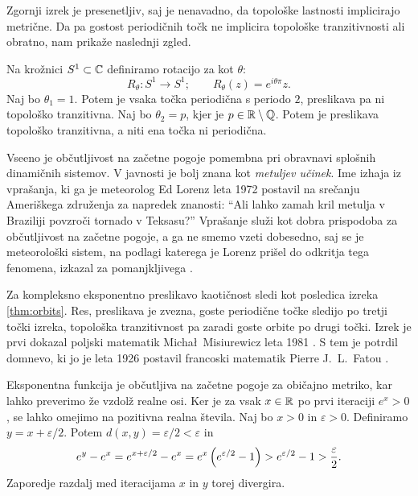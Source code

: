 \noindent Zgornji izrek je presenetljiv, saj je nenavadno, da topološke lastnosti implicirajo metrične. Da pa gostost periodičnih točk ne implicira topološke tranzitivnosti ali obratno, nam prikaže naslednji zgled.

\begin{zgled}
    Na krožnici \(S^1 \subset \mathbb C\) definiramo rotacijo za kot \(\theta\):
    \[R_\theta \colon S^1 \to S^1; \qquad R_\theta (z) = e^{i \theta \pi} z.\]
    Naj bo \(\theta_1 = 1\). Potem je vsaka točka periodična s periodo \(\num{2}\), preslikava pa ni topološko  tranzitivna. Naj bo \(\theta_2 = p\), kjer je \(p \in \mathbb R \setminus \mathbb Q\). Potem je preslikava topološko tranzitivna, a niti ena točka ni periodična.
\end{zgled}

\noindent Vseeno je občutljivost na začetne pogoje pomembna pri obravnavi splošnih dinamičnih sistemov. V javnosti je bolj znana kot \emph{metuljev učinek}. Ime izhaja iz vprašanja, ki ga je meteorolog Ed Lorenz leta \num{1972} postavil na srečanju Ameriškega združenja za napredek znanosti: ``Ali lahko zamah kril metulja v Braziliji povzroči tornado v Teksasu?'' Vprašanje služi kot dobra prispodoba za občutljivost na začetne pogoje, a ga ne smemo vzeti dobesedno, saj se je meteorološki sistem, na podlagi katerega je Lorenz prišel do odkritja tega fenomena, izkazal za pomanjkljivega \cite{Pielke_2024}.

Za kompleksno eksponentno preslikavo kaotičnost sledi kot posledica izreka \ref{thm:orbits}. Res, preslikava je zvezna, goste periodične točke sledijo po tretji točki izreka, topološka tranzitivnost pa zaradi goste orbite po drugi točki. Izrek je prvi dokazal poljski matematik Micha\l\ Misiurewicz leta \num{1981} \cite{Misiurewicz_1981}. S tem je potrdil domnevo, ki jo je leta \num{1926} postavil francoski matematik Pierre J.~L.~Fatou \cite{Fatou_1926}.

\begin{primer}
    Eksponentna funkcija je občutljiva na začetne pogoje za običajno metriko, kar lahko preverimo že vzdolž realne osi. Ker je za vsak \(x \in \mathbb R\) po prvi iteraciji \(e^x > 0\), se lahko omejimo na pozitivna realna števila. Naj bo \(x > 0\) in \(\varepsilon > 0\). Definiramo \(y = x + \varepsilon / 2\). Potem \(d (x, y) = \varepsilon / 2 < \varepsilon\) in
    \[e^{y} - e^{x} = e^{x + \varepsilon / 2} - e^x = e^x \left( e^{\varepsilon / 2} - 1 \right) > e^{\varepsilon / 2} - 1 > \frac{\varepsilon}{2}.\]
    Zaporedje razdalj med iteracijama \(x\) in \(y\) torej divergira.
\end{primer}

